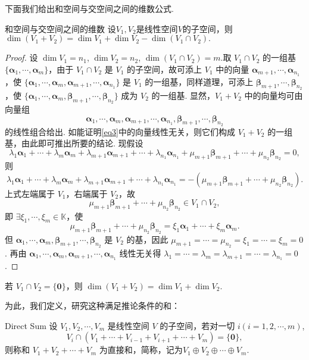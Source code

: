 \documentclass[12pt, a4paper,newtx]{ctexart}
\begin{document}
下面我们给出和空间与交空间之间的维数公式. \begin{theorem}{和空间与交空间之间的维数}{}
	设$V_1,V_2$是线性空间$V$的子空间，则$\dim(V_1+V_2)=\dim  V_1+\dim V_2-\dim(V_1\cap V_2).$
\end{theorem}
\begin{proof}
	设 $\dim V_1 = n_1$, $\dim V_2 = n_2$, $\dim(V_1 \cap V_2) = m$.取 $V_1 \cap V_2$ 的一组基 $\{\bm\alpha_1, \cdots, \bm\alpha_m\}$，由于 $V_1 \cap V_2$ 是 $V_1$ 的子空间，故可添上 $V_1$ 中的向量 $\bm\alpha_{m+1}, \cdots, \bm\alpha_{n_1}$，使 $\{\bm\alpha_1, \cdots, \bm\alpha_m, \bm\alpha_{m+1}, \cdots, \bm\alpha_{n_1}\}$ 是 $V_1$ 的一组基，同样道理，可添上 $\bm\beta_{m+1}, \cdots, \bm\beta_{n_2}$，使 $\{\bm\alpha_1, \cdots, \bm\alpha_m, \bm\beta_{m+1}, \cdots, \bm\beta_{n_2}\}$ 成为 $V_2$ 的一组基. 显然，$V_1 + V_2$ 中的向量均可由向量组\begin{equation}\label{eq3}
		\bm\alpha_1, \cdots, \bm\alpha_m, \bm\alpha_{m+1}, \cdots, \bm\alpha_{n_1}, \bm\beta_{m+1}, \cdots, \bm\beta_{n_2} 
	\end{equation}
	的线性组合给出. 如能证明\eqref{eq3}中的向量线性无关，则它们构成 $V_1 + V_2$ 的一组基，由此即可推出所要的结论. 现假设
	\[
	\lambda_1 \bm\alpha_1 + \cdots + \lambda_m \bm\alpha_m + \lambda_{m+1} \bm\alpha_{m+1} + \cdots + \lambda_{n_1} \bm\alpha_{n_1} + \mu_{m+1} \bm\beta_{m+1} + \cdots + \mu_{n_2} \bm\beta_{n_2} = 0,
	\]
	则
	\[
	\lambda_1 \bm\alpha_1 + \cdots + \lambda_m \bm\alpha_m + \lambda_{m+1} \bm\alpha_{m+1} + \cdots + \lambda_{n_1} \bm\alpha_{n_1} = -(\mu_{m+1} \bm\beta_{m+1} + \cdots + \mu_{n_2} \bm\beta_{n_2}).
	\]
	上式左端属于 $V_1$，右端属于 $V_2$，故
	\[
	\mu_{m+1} \bm\beta_{m+1} + \cdots + \mu_{n_2} \bm\beta_{n_2} \in V_1 \cap V_2,
	\]
	即 $\exists\xi_1, \cdots, \xi_m \in \mathbb{K}$，使
	\[
	\mu_{m+1} \bm\beta_{m+1} + \cdots + \mu_{n_2} \bm\beta_{n_2} = \xi_1 \bm\alpha_1 + \cdots + \xi_m \bm\alpha_m.
	\]
	但 $\bm\alpha_1, \cdots, \bm\alpha_m, \bm\beta_{m+1}, \cdots, \bm\beta_{n_2}$ 是 $V_2$ 的基，因此 $\mu_{m+1} = \cdots = \mu_{n_2} = \xi_1 = \cdots = \xi_m = 0$. 再由 $\bm\alpha_1, \cdots, \bm\alpha_m, \bm\alpha_{m+1}, \cdots, \bm\alpha_{n_1}$ 线性无关得 $\lambda_1 = \cdots = \lambda_m = \lambda_{m+1} = \cdots = \lambda_{n_1} = 0$. 
\end{proof}
\begin{corollary}{}{}
	若 $V_1 \cap V_2 = \{\bm 0\}$，则 $\dim(V_1 + V_2) = \dim V_1 + \dim V_2$. 
\end{corollary}
为此，我们定义\textbf{}，研究这种满足推论条件的和：
\begin{definition}{}{Direct Sum}\kaishu 
	设 $V_1, V_2, \cdots, V_m$ 是线性空间 $V$ 的子空间，若对一切 $i (i = 1, 2, \cdots, m)$,
	\[ V_i \cap (V_1 + \cdots + V_{i-1} + V_{i+1} + \cdots + V_m) = \{\bm 0\}, \]
	则称和 $V_1 + V_2 + \cdots + V_m$ 为直接和，简称{\heiti }，记为$ V_1 \oplus V_2 \oplus \cdots \oplus V_m. $
\end{definition}
\end{document}
